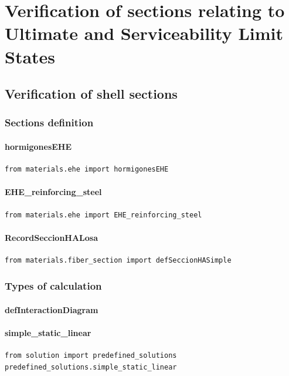 \chapter{Verification of sections relating to Ultimate and Serviceability Limit States}
\section{Verification of shell sections}
\subsection{Sections definition}
\subsubsection{hormigonesEHE}
\begin{verbatim}
from materials.ehe import hormigonesEHE
\end{verbatim}

\subsubsection{EHE\_reinforcing\_steel}
\begin{verbatim}
from materials.ehe import EHE_reinforcing_steel
\end{verbatim}

\subsubsection{RecordSeccionHALosa}
\begin{verbatim}
from materials.fiber_section import defSeccionHASimple
\end{verbatim}


\subsection{Types of calculation}
\subsubsection{defInteractionDiagram}

\subsubsection{simple\_static\_linear}
\begin{verbatim}
from solution import predefined_solutions
predefined_solutions.simple_static_linear
\end{verbatim}

